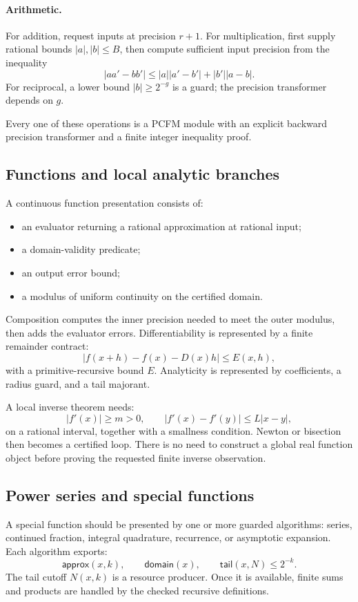 \paragraph{Arithmetic.}
For addition, request inputs at precision \(r+1\).  For multiplication, first
supply rational bounds \(|a|,|b|\le B\), then compute sufficient input
precision from the inequality
\[
 |aa'-bb'|\le |a||a'-b'|+|b'||a-b|.
\]
For reciprocal, a lower bound \(|b|\ge 2^{-g}\) is a guard; the precision
transformer depends on \(g\).

Every one of these operations is a PCFM module with an explicit backward
precision transformer and a finite integer inequality proof.

\subsection{Functions and local analytic branches}

A continuous function presentation consists of:
\begin{itemize}
\item an evaluator returning a rational approximation at rational input;
\item a domain-validity predicate;
\item an output error bound;
\item a modulus of uniform continuity on the certified domain.
\end{itemize}

Composition computes the inner precision needed to meet the outer modulus,
then adds the evaluator errors.  Differentiability is represented by a finite
remainder contract:
\[
 |f(x+h)-f(x)-D(x)h|\le E(x,h),
\]
with a primitive-recursive bound \(E\).  Analyticity is represented by
coefficients, a radius guard, and a tail majorant.

A local inverse theorem needs:
\[
 |f'(x)|\ge m>0,\qquad
 |f'(x)-f'(y)|\le L|x-y|,
\]
on a rational interval, together with a smallness condition.  Newton or
bisection then becomes a certified loop.  There is no need to construct a
global real function object before proving the requested finite inverse
observation.

\subsection{Power series and special functions}

A special function should be presented by one or more guarded algorithms:
series, continued fraction, integral quadrature, recurrence, or asymptotic
expansion.  Each algorithm exports:
\[
  \mathsf{approx}(x,k),\qquad
  \mathsf{domain}(x),\qquad
  \mathsf{tail}(x,N)\le2^{-k}.
\]
The tail cutoff \(N(x,k)\) is a resource producer.  Once it is available,
finite sums and products are handled by the checked recursive definitions.

